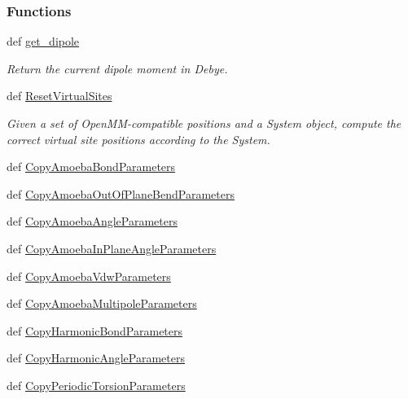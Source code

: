 \subsubsection*{\-Functions}
\begin{DoxyCompactItemize}
\item 
def \hyperlink{namespaceforcebalance_1_1openmmio_a8a2081dcaf027b9b9ab224e22680714d}{get\-\_\-dipole}
\begin{DoxyCompactList}\small\item\em \-Return the current dipole moment in \-Debye. \end{DoxyCompactList}\item 
def \hyperlink{namespaceforcebalance_1_1openmmio_af623fa5af97de6c6a0bc5f98ce8db432}{\-Reset\-Virtual\-Sites}
\begin{DoxyCompactList}\small\item\em \-Given a set of \-Open\-M\-M-\/compatible positions and a \-System object, compute the correct virtual site positions according to the \-System. \end{DoxyCompactList}\item 
def \hyperlink{namespaceforcebalance_1_1openmmio_a792a195b31612f2140b35927fe28fa1a}{\-Copy\-Amoeba\-Bond\-Parameters}
\item 
def \hyperlink{namespaceforcebalance_1_1openmmio_a2e95f600757655d41660c25af8fd8e80}{\-Copy\-Amoeba\-Out\-Of\-Plane\-Bend\-Parameters}
\item 
def \hyperlink{namespaceforcebalance_1_1openmmio_abe9a6b9b200dc8487e56dad7249af3ec}{\-Copy\-Amoeba\-Angle\-Parameters}
\item 
def \hyperlink{namespaceforcebalance_1_1openmmio_ad0d4739f80f2aab1a861f2e03b8efcd6}{\-Copy\-Amoeba\-In\-Plane\-Angle\-Parameters}
\item 
def \hyperlink{namespaceforcebalance_1_1openmmio_abe005f73c6dfe9ce1052c9434bcad9be}{\-Copy\-Amoeba\-Vdw\-Parameters}
\item 
def \hyperlink{namespaceforcebalance_1_1openmmio_a3706c19e71969cabe5782a4535abeffe}{\-Copy\-Amoeba\-Multipole\-Parameters}
\item 
def \hyperlink{namespaceforcebalance_1_1openmmio_a616f12cc53381716e5fa41f00bf623be}{\-Copy\-Harmonic\-Bond\-Parameters}
\item 
def \hyperlink{namespaceforcebalance_1_1openmmio_af4ed16f5e2b1cd12bce2f25fab1b05bc}{\-Copy\-Harmonic\-Angle\-Parameters}
\item 
def \hyperlink{namespaceforcebalance_1_1openmmio_a8f13702754f0b4e43e272139a2ce8341}{\-Copy\-Periodic\-Torsion\-Parameters}

\end{DoxyCompactItemize}

